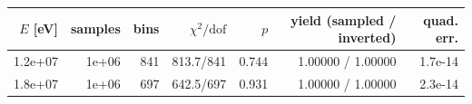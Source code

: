 \begin{tabular}{rrrrrrr}
\toprule
$E$ [eV] & samples & bins & $\chi^2/\mathrm{dof}$ & $p$ & yield (sampled / inverted) & quad. err. \\
\midrule
1.2e+07 & 1e+06 & 841 & 813.7/841 & 0.744 & 1.00000 / 1.00000 & 1.7e-14 \\
1.8e+07 & 1e+06 & 697 & 642.5/697 & 0.931 & 1.00000 / 1.00000 & 2.3e-14 \\
\bottomrule
\end{tabular}
